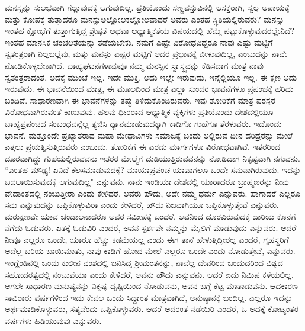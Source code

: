 ಮನಸ್ಸನ್ನು ಸುಲಭವಾಗಿ ಗೆಲ್ಲುವುದಕ್ಕೆ ಆಗುವುದಿಲ್ಲ. ಪ್ರತಿಯೊಂದು ಸಣ್ಣ\break ವಸ್ತುವಿನಲ್ಲಿ ಆಸಕ್ತರಾಗಿ, ಸ್ವಲ್ಪ ಅಪಾಯಕ್ಕೆ ಮತ್ತು ಕೋಪಕ್ಕೆ ತುತ್ತಾದರೂ ಮನಸ್ಸು\break ಅಲ್ಲೋಲಕಲ್ಲೋಲವಾದರೆ ಅವರು ಎಂತಹ ಸ್ಥಿತಿಯಲ್ಲಿರುವರು? ಮನಸ್ಸು ಇಂತಹ ಕ್ಷೋಭೆಗೆ ತುತ್ತಾಗುತ್ತಿದ್ದ ಶ್ರೇಷ್ಠತೆ ಅಥವಾ ಆಧ್ಯಾತ್ಮಿಕತೆಯ ವಿಷಯದಲ್ಲಿ ಹೆಮ್ಮೆ ಪಟ್ಟುಕೊಳ್ಳುವುದರಲ್ಲೇನಿದೆ? ಇಂತಹ ಮಾನಸಿಕ ಚಂಚಲತೆಯನ್ನು ತಡೆಯಬೇಕು. ನಮಗೆ ಎಷ್ಟೇ ವಿರೋಧವಿದ್ದರೂ ನಾವು ಎಷ್ಟು ಮಟ್ಟಿಗೆ ಸ್ವತಂತ್ರರಾಗಿ ನಿಲ್ಲಬಲ್ಲೆವು, ಮತ್ತು ಮನಸ್ಸು ಎಷ್ಟರ ಮಟ್ಟಿಗೆ ಅದರ ಪ್ರಭಾವಕ್ಕೆ ಬೀಳುವುದಿಲ್ಲ, ಎಂಬುದನ್ನು ನಾವೇ ನೋಡಿಕೊಳ್ಳಬೇಕಾಗಿದೆ. ಬಾಹ್ಯಘಟನೆಗಳಾವುವೂ ನಮ್ಮ ಮನಸ್ಸಿನ ಸ್ವಾಸ್ಥ್ಯವನ್ನು ಕೆಡಿಸದಾಗ ಮಾತ್ರ ನಾವು ಸ್ವತಂತ್ರರಾದಂತೆ, ಅದಕ್ಕೆ ಮುಂಚೆ ಇಲ್ಲ. ಇದೇ ಮುಕ್ತಿ. ಅದು ಇಲ್ಲೇ ಇರುವುದು, ಇನ್ನೆಲ್ಲಿಯೂ ಇಲ್ಲ. ಈ ಕ್ಷಣ ಅದು ಇರುವುದು. ಈ ಭಾವನೆಯಿಂದ ಮಾತ್ರ, ಈ ಮೂಲದಿಂದ ಮಾತ್ರ ಎಲ್ಲಾ ಸುಂದರ ಭಾವನೆಗಳೂ ಪ್ರಪಂಚಕ್ಕೆ ಹರಿದು ಬಂದಿವೆ. ಸಾಧಾರಣವಾಗಿ ಈ ಭಾವನೆಗಳನ್ನು ತಪ್ಪು ತಿಳಿದುಕೊಂಡಿರುವರು. ಇವು ತೋರಿಕೆಗೆ ಮಾತ್ರ ಪರಸ್ಪರ ವಿರೋಧವಾಗಿರುವಂತೆ ಕಾಣುವುವು. ಹಲವು ಧೀರರಾದ ಆಧ್ಯಾತ್ಮಿಕ ವ್ಯಕ್ತಿಗಳು ಪ್ರತಿಯೊಂದು ದೇಶದಲ್ಲಿಯೂ ಬಾಹ್ಯಪ್ರಪಂಚದ ಸಂಬಂಧವನ್ನೆಲ್ಲ ತ್ಯಜಿಸಿ ಧ್ಯಾನಮಾಡುವುದಕ್ಕಾಗಿ ಕಾಡಿಗೊ ಗುಹೆಗೂ ತೆರಳುವರು. ಇದೊಂದು ಭಾವನೆ. ಮತ್ತೊಂದೇ ಪ್ರಖ್ಯಾತರಾದ ಮಹಾ ಮೇಧಾವಿಗಳು ಸಮಾಜಕ್ಕೆ ಬಂದು ಅಲ್ಲಿರುವ ದೀನ ದರಿದ್ರರನ್ನು ಮೇಲೆ ಎತ್ತಲು ಪ್ರಯತ್ನಿಸುತ್ತಿರುವರು ಎಂಬುದು. ತೋರಿಕೆಗೆ ಈ ಎರಡು ಮಾರ್ಗಗಳೂ ವಿರೋಧವಾಗಿವೆ. ಇತರರಿಂದ ದೂರವಾಗಿದ್ದು ಗುಹೆಯಲ್ಲಿರುವವನು ಇತರರ ಮೇಲ್ಮೆಗೆ ದುಡಿಯುತ್ತಿರುವವನನ್ನು ನೋಡಿದಾಗ ನಿಕೃಷ್ಟವಾಗಿ ನಗುವನು. “ಎಂತಹ ಮೌಢ್ಯ! ಏನಿದೆ ಕೆಲಸಮಾಡುವುದಕ್ಕೆ? ಮಾಯಾಪ್ರಪಂಚ ಯಾವಾಗಲೂ ಒಂದೇ ಸಮನಾಗಿರುವುದು. ಇದನ್ನು ಬದಲಾಯಿಸುವುದಕ್ಕೆ ಆಗುವುದಿಲ್ಲ" ಎನ್ನುವನು. ನಾನು ಇಂಡಿಯಾ ದೇಶದಲ್ಲಿ ಯಾರಾದರೂ ಬ್ರಾಹ್ಮಣರನ್ನು ನೀವು ವೇದಾಂತದಲ್ಲಿ ನಂಬುತ್ತೀರಾ ಎಂದು ಕೇಳಿದರೆ, ಅವರು ಹೌದು, ಅದೇ ನಮ್ಮ ಧರ್ಮ ಎನ್ನುವರು. ಹಾಗಾದರೆ ಎಲ್ಲರೂ ಸಮ ಎನ್ನುವುದನ್ನು ಒಪ್ಪಿಕೊಳ್ಳುವಿರಾ ಎಂದು ಕೇಳಿದರೆ, ಹೌದು ನಿಜವಾಗಿಯೂ ಒಪ್ಪಿಕೊಳ್ಳುತ್ತೇವೆ ಎನ್ನುವರು. ಮರುಕ್ಷಣವೇ ಯಾವ ಚಂಡಾಲನಾದರೂ ಅವರ ಸಮೀಪಕ್ಕೆ ಬಂದರೆ, ಅವನಿಂದ ದೂರವಿರುವುದಕ್ಕೆ ದಾರಿಯ ಕೊನೆಗೆ ನೆಗೆದು ಓಡುವರು. ಏತಕ್ಕೆ ಓಡುವಿರಿ ಎಂದರೆ, ಅವನ ಸ್ಪರ್ಶವೇ ನಮ್ಮನ್ನು ಮೈಲಿಗೆ ಮಾಡುವುದು ಎನ್ನುವರು. ಆದರೆ ನೀವೂ ಎಲ್ಲರೂ ಒಂದೇ, ಯಾರೂ ಹೆಚ್ಚು ಕಡಮೆಯಲ್ಲ ಎಂದು ಈಗ ತಾನೆ ಹೇಳುತ್ತಿದ್ದೀರಲ್ಲ ಎಂದರೆ, ಗೃಹಸ್ಥರಿಗೆ ಅದೆಲ್ಲ ಬರಿಯ ಬಾಯಿಮಾತು, ನಾವು ಕಾಡಿಗೆ ಹೋದ ಮೇಲೆ ಎಲ್ಲರೂ ಒಂದೇ ಎಂದು ನೋಡುತ್ತೇವೆ, ಎನ್ನುವರು. ಇಂಗ್ಲೆಂಡಿನಲ್ಲಿ ಒಂದು ಕುಲೀನ ವಂಶದಲ್ಲಿ ಜನಿಸಿದ್ದ ಶ‍್ರೀಮಂತನನ್ನು, ನಾವೆಲ್ಲ ದೇವರಿಂದ ಬಂದುದರಿಂದ ವಿಶ್ವದ ಸಹೋದರತ್ವದಲ್ಲಿ ನಂಬುವೆಯಾ ಎಂದು ಕೇಳಿದರೆ, ಅವನು ಹೌದು ಎನ್ನುವನು. ಆದರೆ ಐದು ನಿಮಿಷ ಕಳೆಯಲಿಲ್ಲ, ಆಗಲೇ ಸಾಧಾರಣ ಮನುಷ್ಯನನ್ನು ನಿಕೃಷ್ಟ ದೃಷ್ಟಿಯಿಂದ ನೋಡುವನು, ಅವನ ಬಗ್ಗೆ ಕೆಟ್ಟ ಮಾತಾಡುವನು. ಆದಕಾರಣ ಸಾವಿರಾರು ವರ್ಷಗಳಿಂದ ಇದು ಕೇವಲ ಒಂದು ಸಿದ್ದಾಂತ ಮಾತ್ರವಾಗಿದೆ, ಅನುಷ್ಠಾನಕ್ಕೆ ಬಂದಿಲ್ಲ. ಎಲ್ಲರೂ ಇದನ್ನು ಅರ್ಥಮಾಡಿಕೊಳ್ಳುವರು, ಸತ್ಯವೆಂದು ಒಪ್ಪಿಕೊಳ್ಳುವರು. ಆದರೆ ಅದರಂತೆ ನಡೆಯಿರಿ ಎಂದರೆ, ಓ ಅದಕ್ಕೆ ಕೋಟ್ಯಂತರ ವರ್ಷಗಳು ಹಿಡಿಯುವುವು ಎನ್ನುವರು.

